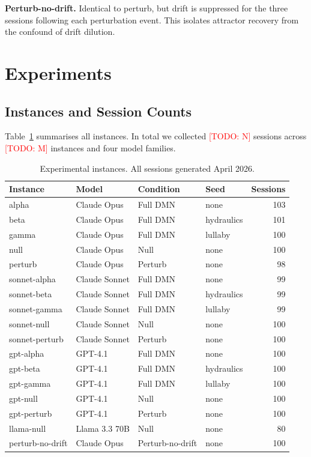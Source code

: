\documentclass{article}
\newcommand{\todo}[1]{\textcolor{red}{[TODO: #1]}}
\begin{document}
\textbf{Perturb-no-drift.} Identical to perturb, but drift is suppressed for
the three sessions following each perturbation event. This isolates attractor
recovery from the confound of drift dilution.

\section{Experiments}
\label{sec:experiments}

\subsection{Instances and Session Counts}

Table~\ref{tab:instances} summarises all instances. In total we collected
\todo{N} sessions across \todo{M} instances and four model families.

\begin{table}[H]
\centering
\caption{Experimental instances. All sessions generated April 2026.}
\label{tab:instances}
\small
\begin{tabular}{llllr}
\toprule
\textbf{Instance} & \textbf{Model} & \textbf{Condition} & \textbf{Seed} & \textbf{Sessions} \\
\midrule
alpha        & Claude Opus   & Full DMN  & none         & 103 \\
beta         & Claude Opus   & Full DMN  & hydraulics   & 101 \\
gamma        & Claude Opus   & Full DMN  & lullaby      & 100 \\
null         & Claude Opus   & Null      & none         & 100 \\
perturb      & Claude Opus   & Perturb   & none         &  98 \\
\midrule
sonnet-alpha & Claude Sonnet & Full DMN  & none         &  99 \\
sonnet-beta  & Claude Sonnet & Full DMN  & hydraulics   &  99 \\
sonnet-gamma & Claude Sonnet & Full DMN  & lullaby      &  99 \\
sonnet-null  & Claude Sonnet & Null      & none         & 100 \\
sonnet-perturb & Claude Sonnet & Perturb & none         & 100 \\
\midrule
gpt-alpha    & GPT-4.1       & Full DMN  & none         & 100 \\
gpt-beta     & GPT-4.1       & Full DMN  & hydraulics   & 100 \\
gpt-gamma    & GPT-4.1       & Full DMN  & lullaby      & 100 \\
gpt-null     & GPT-4.1       & Null      & none         & 100 \\
gpt-perturb  & GPT-4.1       & Perturb   & none         & 100 \\
\midrule
llama-null   & Llama 3.3 70B & Null      & none         &  80 \\
\midrule
perturb-no-drift & Claude Opus & Perturb-no-drift & none & 100 \\
\bottomrule
\end{tabular}
\end{table}
\end{document}
